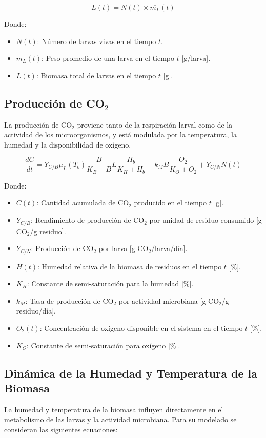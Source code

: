 \begin{equation}
L(t) = N(t) \times \overline{m_L}(t)
\end{equation}

Donde:
\begin{itemize}
    \item $N(t)$: N\'umero de larvas vivas en el tiempo $t$.
    \item $\overline{m_L}(t)$: Peso promedio de una larva en el tiempo $t$ [g/larva].
    \item $L(t)$: Biomasa total de larvas en el tiempo $t$ [g].
\end{itemize}

\subsection{Producci\'on de CO$_2$}
La producci\'on de CO$_2$ proviene tanto de la respiraci\'on larval como de la actividad de los microorganismos, y est\'a modulada por la temperatura, la humedad y la disponibilidad de ox\'igeno.

\begin{equation}
\frac{dC}{dt} = Y_{C/B} \mu_L(T_b) \frac{B}{K_B + B} L \frac{H_b}{K_H + H_b} + k_M B \frac{O_2}{K_O + O_2} + Y_{C/N} N(t)
\end{equation}

Donde:
\begin{itemize}
    \item $C(t)$: Cantidad acumulada de CO$_2$ producido en el tiempo $t$ [g].
    \item $Y_{C/B}$: Rendimiento de producci\'on de CO$_2$ por unidad de residuo consumido [g CO$_2$/g residuo].
    \item $Y_{C/N}$: Producci\'on de CO$_2$ por larva [g CO$_2$/larva/d\'ia].
    \item $H(t)$: Humedad relativa de la biomasa de residuos en el tiempo $t$ [\%].
    \item $K_H$: Constante de semi-saturaci\'on para la humedad [\%].
    \item $k_M$: Tasa de producci\'on de CO$_2$ por actividad microbiana [g CO$_2$/g residuo/d\'ia].
    \item $O_2(t)$: Concentraci\'on de ox\'igeno disponible en el sistema en el tiempo $t$ [\%].
    \item $K_O$: Constante de semi-saturaci\'on para ox\'igeno [\%].
\end{itemize}

\subsection{Din\'amica de la Humedad y Temperatura de la Biomasa}
La humedad y temperatura de la biomasa influyen directamente en el metabolismo de las larvas y la actividad microbiana. Para su modelado se consideran las siguientes ecuaciones:

